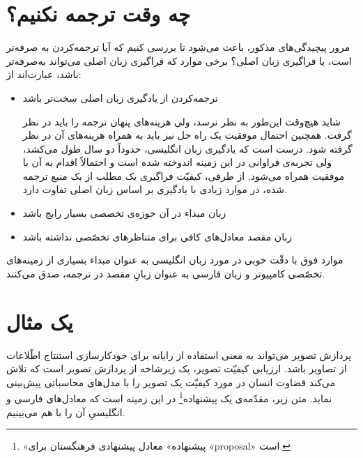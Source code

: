\documentclass{article}
\begin{document}
\section*{چه وقت ترجمه نکنیم؟}
مرور پیچیدگی‌های مذکور، باعث می‌شود تا بررسی کنیم که آیا ترجمه‌کردن به صرفه‌تر است، یا فراگیری زبان اصلی؟ برخی موارد که فراگیری زبان اصلی می‌تواند به‌صرفه‌تر باشد، عبارت‌اند از:
\begin{itemize}
	\item ترجمه‌کردن از یادگیری زبان اصلی سخت‌تر باشد

		شاید هیچ‌وقت این‌طور به نظر نرسد، ولی هزینه‌های پنهان ترجمه را باید در نظر گرفت. همچنین احتمال موفقیت یک راه حل نیز باید به همراه هزینه‌های آن در نظر گرفته شود. درست است که یادگیری زبان انگلیسی، حدوداً دو سال طول می‌کشد، ولی تجربه‌ی فراوانی در این زمینه اندوخته شده است و احتمالاً اقدام به آن با موفقیت همراه می‌شود. از طرفی، کیفیّت فراگیری یک مطلب از یک منبع ترجمه شده، در موارد زیادی با یادگیری بر اساس زبان اصلی تفاوت دارد.
	\item زبان مبداء در آن حوزه‌ی تخصصی بسیار رابج باشد
	\item زبان مقصد معادل‌های کافی برای متناظرهای تخصّصی نداشته باشد
\end{itemize}
موارد فوق با دقّت خوبی در مورد زبان انگلیسی به عنوان مبداء بسیاری از زمینه‌های تخصّصی کامپیوتر و زبان فارسی به عنوان زبانِ مقصد در ترجمه، صدق می‌کنند. 
\section*{یک مثال}
پردازش تصویر می‌تواند به معنی استفاده از رایانه برای خودکار‌سازی استنتاج اطّلاعات از تصاویر باشد. ارزیابی کیفیّت تصویر، یک زیرشاخه از پردازش تصویر است که تلاش می‌کند قضاوت انسان در مورد کیفیّت یک تصویر را با مدل‌های محاسباتی پیش‌بینی نماید. متن زیر، مقدّمه‌ی یک پیشنهاده\footnote{«پیشنهاده» معادل پیشنهادی فرهنگستان برای «proposal» است.} در این زمینه است که معادل‌های فارسی و انگلیسیِ آن را با هم می‌بینیم.
\end{document}
